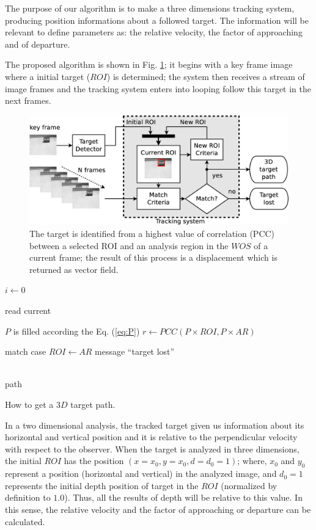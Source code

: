 The purpose of our algorithm is to make a three dimensions tracking system, producing position informations 
about a followed target.
The information will be relevant to define parameters 
as: the relative velocity, the factor of approaching and of departure.

The proposed algorithm is shown in Fig. \ref{fig:system};
it begins with a key frame image where a initial target ($ROI$) is determined; 
the system then receives a stream of image frames and the tracking system 
enters into looping follow this target in the next frames.

\begin{figure}[bhp]
\includegraphics[width=\columnwidth]{images/figure1-diagram1.eps}
\caption{The target is identified from a highest value of correlation (PCC) between a selected ROI and an analysis region in
the $WOS$ of a current frame; the result of this process is a displacement which is  returned as vector field.}
\label{fig:system}
\end{figure}

\begin{algorithm}[H]
 $i \leftarrow 0$ \;\\
 
{
    read current\;
    
    $P$ is filled according the Eq. (\ref{eq:P})\;
    $r \leftarrow PCC(P\times ROI,P\times AR)$\;
  
    {
        match case\;
        {
            $ROI\leftarrow AR$\;
        }
    }
    {
    \Return  message ``target lost'' \;
    }
}
\\
\Return path \;
\caption{How to get a $3D$ target path.}
\end{algorithm}

In a two dimensional analysis, the tracked target given us information about its horizontal 
and vertical position and it is relative to the perpendicular velocity with respect to the observer.
When the target is analyzed in three dimensions, 
the initial $ROI$ has the position $(x=x_0,y=x_0,d=d_0=1)$;
where, $x_0$ and $y_0$ represent a position (horizontal and vertical) in the analyzed image,
and $d_0=1$ represents the initial depth position of target in the $ROI$ (normalized by definition to $1.0$).
Thus, all the results of depth will be relative to this value. In this sense, the relative velocity and 
the factor of approaching or departure can be calculated.

